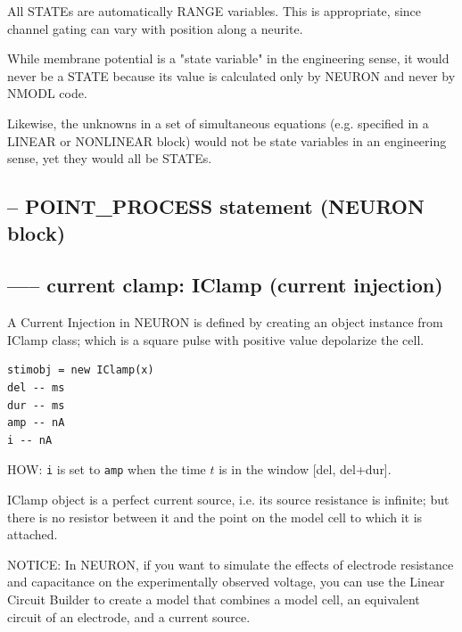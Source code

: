 All STATEs are automatically RANGE variables. This is appropriate, since
channel gating can vary with position along a neurite.

\begin{mdframed}
While membrane potential is a "state variable" in the engineering sense, it
would never be a STATE because its value is calculated only by NEURON and never
by NMODL code.

Likewise, the
unknowns in a set of simultaneous equations (e.g. specified in a LINEAR or
NONLINEAR block) would not be state variables in an engineering sense, yet
they would all be STATEs.

\end{mdframed}



\subsection{-- POINT\_PROCESS statement (NEURON block)}
\label{sec:POINT_PROCESS-statement-NEURON-block}

\subsection{----- current clamp: IClamp (current injection)}
\label{sec:IClamp}

A Current Injection in NEURON is defined by creating an object instance from
IClamp class; which is a square pulse with positive value depolarize the cell.
\begin{verbatim}
stimobj = new IClamp(x)
del -- ms
dur -- ms
amp -- nA
i -- nA
\end{verbatim}

HOW: \verb!i! is set to \verb!amp! when the time $t$ is in the window [del,
del+dur]. 

IClamp object is a perfect current source, i.e. its source resistance is
infinite; but there is no resistor between it and the point on the model cell to
which it is attached. 

\begin{mdframed}

NOTICE: In NEURON, if you want to simulate the effects of electrode resistance
and capacitance on the experimentally observed voltage, you can use the Linear
Circuit Builder to create a model that combines a model cell, an equivalent
circuit of an electrode, and a current source.

\end{mdframed}

